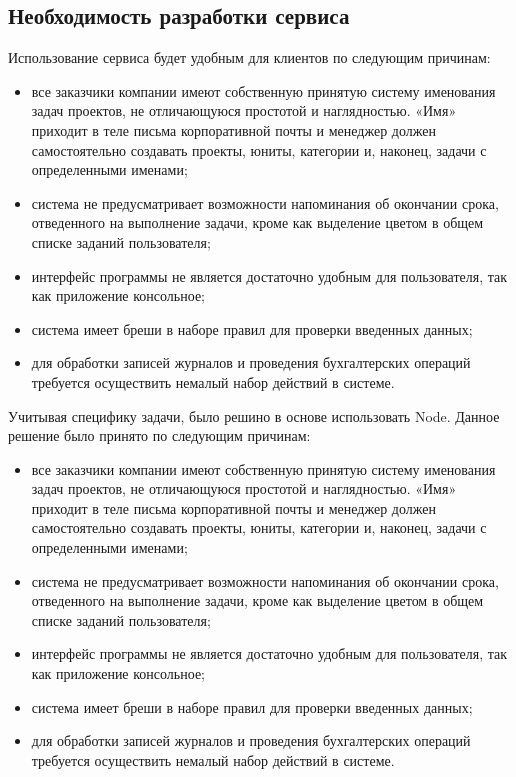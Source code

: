 \subsection{Необходимость разработки сервиса}
Использование сервиса будет удобным для клиентов по следующим причинам: 
\begin{itemize}
  \item все заказчики компании имеют собственную принятую систему именования задач проектов, не отличающуюся простотой и наглядностью. «Имя» приходит в теле письма корпоративной почты и менеджер должен самостоятельно создавать проекты, юниты, категории и, наконец, задачи с определенными именами;
  \item система не предусматривает возможности напоминания об окончании срока, отведенного на выполнение задачи, кроме как выделение цветом в общем списке заданий пользователя;
  \item интерфейс программы не является достаточно удобным для пользователя, так как приложение консольное;
  \item система имеет бреши в наборе правил для проверки введенных данных;
  \item для обработки записей журналов и проведения бухгалтерских операций требуется  осуществить немалый набор действий в системе.
\end{itemize}

Учитывая специфику задачи, было решино в основе использовать Node. Данное решение было принято по следующим причинам:
\begin{itemize}
  \item все заказчики компании имеют собственную принятую систему именования задач проектов, не отличающуюся простотой и наглядностью. «Имя» приходит в теле письма корпоративной почты и менеджер должен самостоятельно создавать проекты, юниты, категории и, наконец, задачи с определенными именами;
  \item система не предусматривает возможности напоминания об окончании срока, отведенного на выполнение задачи, кроме как выделение цветом в общем списке заданий пользователя;
  \item интерфейс программы не является достаточно удобным для пользователя, так как приложение консольное;
  \item система имеет бреши в наборе правил для проверки введенных данных;
  \item для обработки записей журналов и проведения бухгалтерских операций требуется  осуществить немалый набор действий в системе.
\end{itemize}
